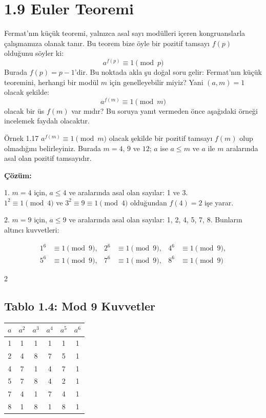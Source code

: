 \section*{1.9 Euler Teoremi}

Fermat'nın küçük teoremi, yalnızca asal sayı modülleri içeren kongruanslarla çalışmamıza olanak tanır. Bu teorem bize öyle bir pozitif tamsayı $f(p)$ olduğunu söyler ki:
\[
a^{f(p)} \equiv 1 \pmod{p}
\]
Burada $f(p) = p - 1$'dir. Bu noktada akla şu doğal soru gelir: Fermat'nın küçük teoremini, herhangi bir modül $m$ için genelleyebilir miyiz? Yani $(a, m) = 1$ olacak şekilde:
\[
a^{f(m)} \equiv 1 \pmod{m}
\]
olacak bir üs $f(m)$ var mıdır? Bu soruya yanıt vermeden önce aşağıdaki örneği incelemek faydalı olacaktır.

\begin{examplebox}{Örnek 1.17}
$a^{f(m)} \equiv 1 \pmod{m}$ olacak şekilde bir pozitif tamsayı $f(m)$ olup olmadığını belirleyiniz. Burada $m = 4$, $9$ ve $12$; $a$ ise $a \leq m$ ve $a$ ile $m$ aralarında asal olan pozitif tamsayıdır.

\textbf{Çözüm:}

1. $m = 4$ için, $a \leq 4$ ve aralarında asal olan sayılar: 1 ve 3. \\
$1^2 \equiv 1 \pmod{4}$ ve $3^2 \equiv 9 \equiv 1 \pmod{4}$ olduğundan $f(4) = 2$ işe yarar.

2. $m = 9$ için, $a \leq 9$ ve aralarında asal olan sayılar: 1, 2, 4, 5, 7, 8. Bunların altıncı kuvvetleri:

\[
\begin{aligned}
1^6 &\equiv 1 \pmod{9}, & 2^6 &\equiv 1 \pmod{9}, & 4^6 &\equiv 1 \pmod{9}, \\
5^6 &\equiv 1 \pmod{9}, & 7^6 &\equiv 1 \pmod{9}, & 8^6 &\equiv 1 \pmod{9}
\end{aligned}
\]

\begin{multicols}{2}
\subsection*{Tablo 1.4: Mod 9 Kuvvetler}
\begin{center}
\begin{tabular}{c|ccccc}
\toprule
$a$ & $a^2$ & $a^3$ & $a^4$ & $a^5$ & $a^6$ \\
\midrule
1 & 1 & 1 & 1 & 1 & 1 \\
2 & 4 & 8 & 7 & 5 & 1 \\
4 & 7 & 1 & 4 & 7 & 1 \\
5 & 7 & 8 & 4 & 2 & 1 \\
7 & 4 & 1 & 7 & 4 & 1 \\
8 & 1 & 8 & 1 & 8 & 1 \\
\bottomrule
\end{tabular}
\end{center}


\end{multicols}
\end{examplebox}
